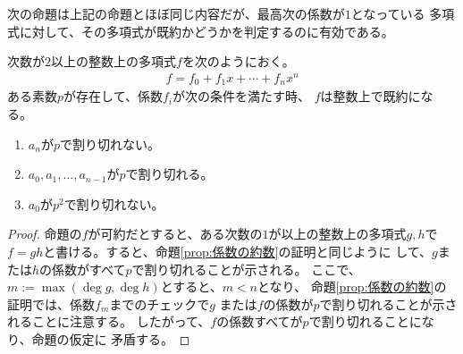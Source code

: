 {	次の命題は上記の命題とほぼ同じ内容だが、最高次の係数が$1$となっている
	多項式に対して、その多項式が既約かどうかを判定するのに有効である。

	\begin{proposition}[Eisensteinの判定法]\label{prop:Eisensteinの判定法} %
		次数が$2$以上の整数上の多項式$f$を次のようにおく。
		\begin{equation*}\begin{split}
			f = f_0 + f_1x + \cdots + f_nx^n
		\end{split}\end{equation*}
		ある素数$p$が存在して、係数$f_i$が次の条件を満たす時、
		$f$は整数上で既約になる。
		\begin{enumerate}\setlength{\itemsep}{-1mm} %
			\item $a_n$が$p$で割り切れない。
			\item $a_0,a_1,\dots,a_{n-1}$が$p$で割り切れる。
			\item $a_0$が$p^2$で割り切れない。
		\end{enumerate} %
	\end{proposition} %
	\begin{proof} %
		命題の$f$が可約だとすると、ある次数の$1$が以上の整数上の多項式$g,h$で
		$f=gh$と書ける。すると、命題\ref{prop:係数の約数}の証明と同じように
		して、$g$または$h$の係数がすべて$p$で割り切れることが示される。
		ここで、$m:=\max(\deg g, \deg h)$とすると、$m<n$となり、
		命題\ref{prop:係数の約数}の証明では、係数$f_m$までのチェックで$g$
		または$f$の係数が$p$で割り切れることが示されることに注意する。
		したがって、$f$の係数すべてが$p$で割り切れることになり、命題の仮定に
		矛盾する。
	\end{proof} %

}
